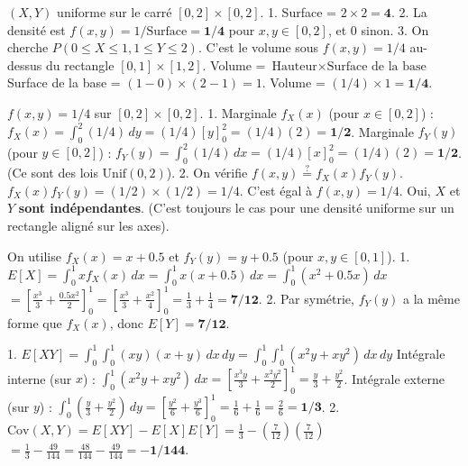 \begin{correctionbox}
$(X, Y)$ uniforme sur le carré $[0, 2] \times [0, 2]$.
1.  Surface = $2 \times 2 = \mathbf{4}$.
2.  La densité est $f(x,y) = 1 / \text{Surface} = \mathbf{1/4}$ pour $x,y \in [0, 2]$, et 0 sinon.
3.  On cherche $P(0 \le X \le 1, 1 \le Y \le 2)$. C'est le volume sous $f(x,y)=1/4$ au-dessus du rectangle $[0,1]\times[1,2]$.
    Volume = $\text{Hauteur} \times \text{Surface de la base}$
    Surface de la base = $(1-0) \times (2-1) = 1$.
    Volume = $(1/4) \times 1 = \mathbf{1/4}$.
\end{correctionbox}

\begin{correctionbox}
$f(x,y) = 1/4$ sur $[0, 2] \times [0, 2]$.
1.  Marginale $f_X(x)$ (pour $x \in [0, 2]$) :
    $f_X(x) = \int_0^2 (1/4) \, dy = (1/4) [y]_0^2 = (1/4)(2) = \mathbf{1/2}$.
    Marginale $f_Y(y)$ (pour $y \in [0, 2]$) :
    $f_Y(y) = \int_0^2 (1/4) \, dx = (1/4) [x]_0^2 = (1/4)(2) = \mathbf{1/2}$.
    (Ce sont des lois $\text{Unif}(0, 2)$).
2.  On vérifie $f(x,y) \stackrel{?}{=} f_X(x) f_Y(y)$.
    $f_X(x) f_Y(y) = (1/2) \times (1/2) = 1/4$.
    C'est égal à $f(x,y) = 1/4$.
    Oui, $X$ et $Y$ \textbf{sont indépendantes}. (C'est toujours le cas pour une densité uniforme sur un rectangle aligné sur les axes).
\end{correctionbox}


\begin{correctionbox}
On utilise $f_X(x) = x+0.5$ et $f_Y(y) = y+0.5$ (pour $x,y \in [0,1]$).
1.  $E[X] = \int_0^1 x f_X(x) \, dx = \int_0^1 x(x+0.5) \, dx = \int_0^1 (x^2 + 0.5x) \, dx$
    $= \left[ \frac{x^3}{3} + \frac{0.5x^2}{2} \right]_0^1 = \left[ \frac{x^3}{3} + \frac{x^2}{4} \right]_0^1 = \frac{1}{3} + \frac{1}{4} = \mathbf{7/12}$.
2.  Par symétrie, $f_Y(y)$ a la même forme que $f_X(x)$, donc $E[Y] = \mathbf{7/12}$.
\end{correctionbox}

\begin{correctionbox}
1.  $E[XY] = \int_0^1 \int_0^1 (xy)(x+y) \, dx \, dy = \int_0^1 \int_0^1 (x^2y + xy^2) \, dx \, dy$
    Intégrale interne (sur $x$) : $\int_0^1 (x^2y + xy^2) \, dx = \left[ \frac{x^3y}{3} + \frac{x^2y^2}{2} \right]_0^1 = \frac{y}{3} + \frac{y^2}{2}$.
    Intégrale externe (sur $y$) : $\int_0^1 (\frac{y}{3} + \frac{y^2}{2}) \, dy = \left[ \frac{y^2}{6} + \frac{y^3}{6} \right]_0^1 = \frac{1}{6} + \frac{1}{6} = \frac{2}{6} = \mathbf{1/3}$.
2.  $\text{Cov}(X, Y) = E[XY] - E[X]E[Y] = \frac{1}{3} - \left(\frac{7}{12}\right)\left(\frac{7}{12}\right)$
    $= \frac{1}{3} - \frac{49}{144} = \frac{48}{144} - \frac{49}{144} = \mathbf{-1/144}$.
\end{correctionbox}

